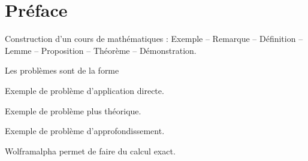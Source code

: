 
\chapter*{Préface}

Construction d'un cours de mathématiques : Exemple -- Remarque -- Définition -- Lemme -- Proposition -- Théorème -- Démonstration.

Les problèmes sont de la forme
\begin{Exercise}[counter=preface]
	Exemple de problème d'application directe.
\end{Exercise}
\begin{Exercise}[difficulty=1, counter=preface]
	Exemple de problème plus théorique.
\end{Exercise}
\begin{Exercise}[difficulty=2, counter=preface]
	Exemple de problème d'approfondissement.
\end{Exercise}

Wolframalpha permet de faire du calcul exact.